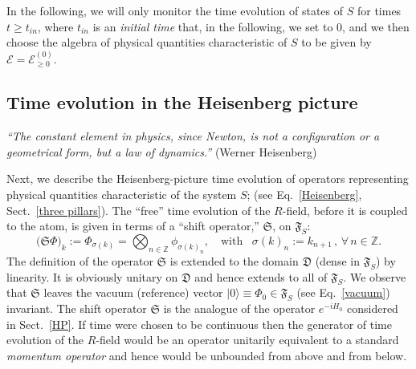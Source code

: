 \documentclass[12pt]{article}
\begin{document}
In the following, we will only monitor the time evolution of states of $S$ for times  $t\geq t_{in}$, where $t_{in}$
is an \textit{initial time} that, in the following, we set to 0, and we then choose the algebra of physical quantities
characteristic of $S$ to be given by $\mathcal{E}= \mathcal{E}_{\geq 0}^{(0)}$.

\subsection{Time evolution in the Heisenberg picture}

\hspace{0.5cm} \textit{``The constant element in physics, since Newton, is not a configuration or a geometrical form, but a law of dynamics.''} (Werner Heisenberg)

Next, we describe the Heisenberg-picture time evolution of operators representing physical quantities characteristic
of the system $S$; (see Eq.~\eqref{Heisenberg}, Sect.~\ref{three pillars}). The ``free'' time evolution of the $R$-field, before it is coupled to the atom, is given in terms of
a ``shift operator,'' $\mathfrak{S}$, on $\mathfrak{F}_S$:
\begin{equation}\label{shift map}
\big(\mathfrak{S}\Phi\big)_{{k}}:= \Phi_{\sigma({k})} = \bigotimes_{n\in \mathbb{Z}} \phi_{\sigma({k})_{n}}, \quad \text{with  }\,\,\, \sigma({k})_n := k_{n+1}\,, \,\forall\, n\in \mathbb{Z}.
\end{equation}
The definition of the operator $\mathfrak{S}$ is extended to the domain $\mathfrak{D}$ (dense in $\mathfrak{F}_S$) by
linearity. It is obviously unitary on $\mathfrak{D}$ and hence extends to all of $\mathfrak{F}_S$. We observe that
$\mathfrak{S}$ leaves the vacuum (reference) vector $\vert 0 \rangle \equiv \Phi_{{0}} \in \mathfrak{F}_S$
(see Eq.~\eqref{vacuum}) invariant. The shift operator $\mathfrak{S}$ is the analogue of the operator $e^{-iH_0}$
considered in Sect.~\ref{HP}. If time were chosen to be continuous then the generator of time evolution of the $R$-field
would be an operator unitarily equivalent to a standard \textit{momentum operator} and hence would be unbounded
from above and from below.
\end{document}
